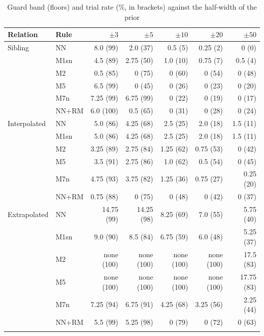 \documentclass[pdflatex,sn-basic]{sn-jnl}
\newcommand{\tabsizesmall}{\footnotesize}
\begin{document}
\begin{table}[p]
\tabsizesmall
\setlength{\tabcolsep}{4pt}
\caption{Guard band (floors) and trial rate (\%, in brackets) against the half-width of the prior}\label{tab:s-prior}
\begin{tabular}{@{}llrrrrr@{}}
\toprule
Relation & Rule & $\pm3$ & $\pm5$ & $\pm10$ & $\pm20$ & $\pm50$ \\
\midrule
Sibling & NN & 8.0 (99) & 2.0 (37) & 0.5 (5) & 0.25 (2) & 0 (0) \\
 & M1sn & 4.5 (89) & 2.75 (50) & 1.0 (10) & 0.75 (7) & 0.5 (4) \\
 & M2 & 0.5 (85) & 0 (75) & 0 (60) & 0 (54) & 0 (48) \\
 & M5 & 6.5 (99) & 0 (45) & 0 (26) & 0 (23) & 0 (20) \\
 & M7n & 7.25 (99) & 6.75 (99) & 0 (22) & 0 (19) & 0 (17) \\
 & NN+RM & 6.0 (100) & 0.5 (65) & 0 (31) & 0 (28) & 0 (24) \\
Interpolated & NN & 5.0 (86) & 4.25 (68) & 2.5 (25) & 2.0 (18) & 1.5 (11) \\
 & M1sn & 5.0 (86) & 4.25 (68) & 2.5 (25) & 2.0 (18) & 1.5 (11) \\
 & M2 & 3.25 (89) & 2.75 (84) & 1.25 (62) & 0.75 (53) & 0 (42) \\
 & M5 & 3.5 (91) & 2.75 (86) & 1.0 (62) & 0.5 (54) & 0 (45) \\
 & M7n & 4.75 (93) & 3.75 (82) & 1.25 (36) & 0.75 (27) & 0.25 (20) \\
 & NN+RM & 0.75 (88) & 0 (75) & 0 (48) & 0 (42) & 0 (37) \\
Extrapolated & NN & 14.75 (99) & 14.25 (98) & 8.25 (69) & 7.0 (55) & 5.75 (40) \\
 & M1sn & 9.0 (90) & 8.5 (84) & 6.75 (59) & 6.0 (48) & 5.25 (37) \\
 & M2 & none (100) & none (100) & none (100) & none (100) & 17.5 (83) \\
 & M5 & none (100) & none (100) & none (100) & none (100) & 17.75 (83) \\
 & M7n & 7.25 (94) & 6.75 (91) & 4.25 (68) & 3.25 (56) & 2.25 (44) \\
 & NN+RM & 5.5 (99) & 5.25 (98) & 0 (79) & 0 (72) & 0 (63) \\
\botrule
\end{tabular}
\end{table}
\end{document}
